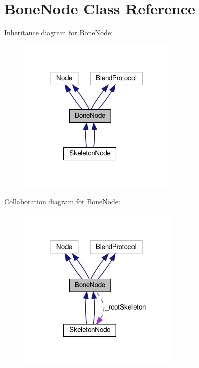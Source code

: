 \hypertarget{classBoneNode}{}\section{Bone\+Node Class Reference}
\label{classBoneNode}


Inheritance diagram for Bone\+Node\+:
\nopagebreak
\begin{figure}[H]
\begin{center}
\leavevmode
\includegraphics[width=216pt]{classBoneNode__inherit__graph}
\end{center}
\end{figure}


Collaboration diagram for Bone\+Node\+:
\nopagebreak
\begin{figure}[H]
\begin{center}
\leavevmode
\includegraphics[width=222pt]{classBoneNode__coll__graph}
\end{center}
\end{figure}
